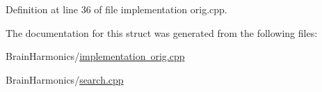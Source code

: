 Definition at line 36 of file implementation orig.\+cpp.



The documentation for this struct was generated from the following files\+:\begin{DoxyCompactItemize}
\item 
Brain\+Harmonics/\mbox{\hyperlink{implementation_01orig_8cpp}{implementation orig.\+cpp}}\item 
Brain\+Harmonics/\mbox{\hyperlink{search_8cpp}{search.\+cpp}}\end{DoxyCompactItemize}
